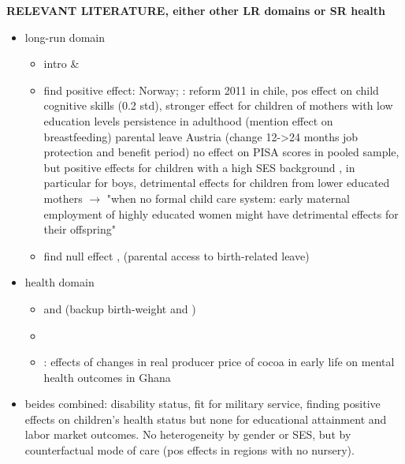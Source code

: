\documentclass[11pt, a4paper]{article} %
\begin{document}
\textbf{RELEVANT LITERATURE, either other LR domains or SR health} 
\begin{itemize}
	\item long-run domain
	\begin{itemize}
		\item intro \cite{currie2011human} \& \cite{almond2017childhood}
		\item find positive effect: \cite{carneiro2015flying} Norway; \cite{albagli2018}: reform 2011 in chile, pos effect on child cognitive skills (0.2 std), stronger effect for children of mothers with low education levels persistence in adulthood (mention effect on breastfeeding)  \cite{danzer2017} parental leave Austria (change 12->24 months job protection and benefit period) no effect on PISA scores in pooled sample, but positive effects for children with a high SES background , in particular for boys, detrimental effects for children from lower educated mothers $\rightarrow$ "when no formal  child care system: early maternal employment of highly educated women might have detrimental effects for their offspring"
		\item find null effect \cite{Dahl2016Case}, \cite{rasmussen2010increasing} (parental access to birth-related leave)
	\end{itemize}
	\item health domain
	\begin{itemize}
		\item \cite{stearns2015effects} and \cite{rossin2011effects} (backup birth-weight \cite{almond2005costs} and \cite{currie2007biology})
		\item \cite{beuchert2016}
		\item \cite{adhvaryu2018early}: effects of changes in real producer price of cocoa in early life on mental health outcomes in Ghana
	\end{itemize}
	\item beides combined: \cite{danzer2017parental} disability status, fit for military service, finding positive effects on children's health status but none for educational attainment and labor market outcomes. No heterogeneity by gender or SES, but by counterfactual mode of care (pos effects in regions with no nursery).
\end{itemize}
\end{document}
